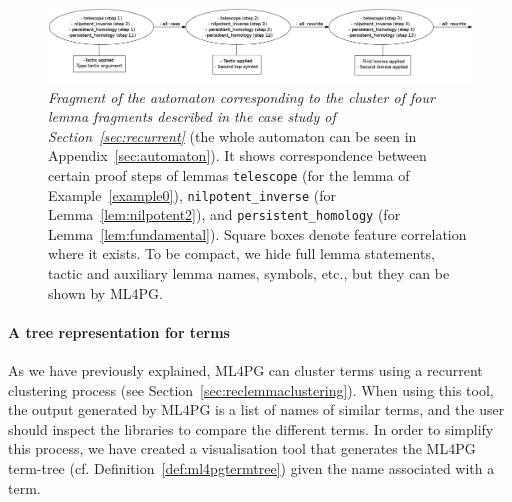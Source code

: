 \begin{figure}[t]
\centering
\includegraphics[scale=.19]{itp6.png}
\caption{\scriptsize{\emph{Fragment of the automaton
 corresponding to the cluster of four lemma fragments described in the case study of Section~\ref{sec:recurrent}} (the whole automaton can be seen in Appendix~\ref{sec:automaton}).
It shows correspondence between certain proof steps of lemmas
\texttt{telescope} (for the lemma of Example~\ref{example0}), \texttt{nilpotent\_inverse} (for Lemma~\ref{lem:nilpotent2}), and \texttt{persistent\_homology}
(for Lemma~\ref{lem:fundamental}). Square boxes denote feature correlation where it exists.
To be compact, we  hide full lemma statements, tactic and auxiliary lemma names, symbols, etc., but they can be shown by ML4PG.
}}\label{fig:automata}
\end{figure}




\paragraph{A tree representation for terms}

As we have previously explained, ML4PG can cluster terms using a recurrent clustering process (see Section~\ref{sec:reclemmaclustering}). When using this tool, the output generated by ML4PG is a list of names of similar terms, and the user should inspect the libraries to compare the different terms. In order to simplify this process, we have created a visualisation tool that generates the ML4PG term-tree (cf. Definition~\ref{def:ml4pgtermtree}) given the name associated with a term.


